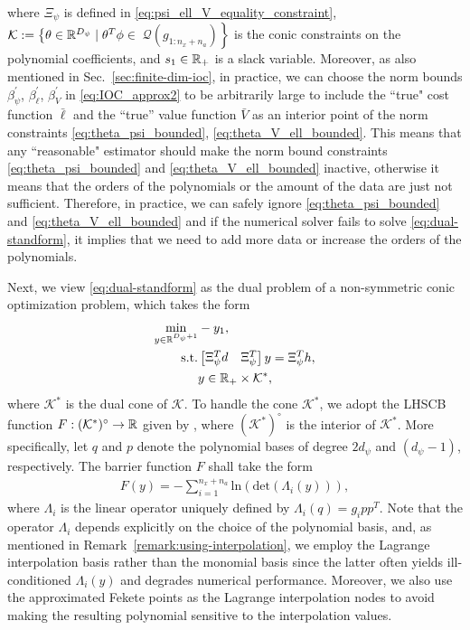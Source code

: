 where $\Xi_\psi$ is defined in \eqref{eq:psi_ell_V_equality_constraint}, $\mathcal{K} := \left\{\theta\in\mathbb{R}^{D_\psi} \mid \theta^T\phi\in \right.$ $\left.\mathscr{Q}(g_{1:n_x+n_a})\right\}$ is the conic constraints on the polynomial coefficients, and $s_1\in\mathbb{R}_+$ is a slack variable. 
Moreover, as also mentioned in Sec.~\ref{sec:finite-dim-ioc}, in practice, we can choose the norm bounds $\beta_\psi^\prime$, $\beta_\ell^\prime$, $\beta_V^\prime$ in \eqref{eq:IOC_approx2} to be arbitrarily large to include the ``true" cost function $\bar{\ell}$ and the ``true'' value function $\bar{V}$ as an interior point of the norm constraints \eqref{eq:theta_psi_bounded}, \eqref{eq:theta_V_ell_bounded}.
This means that any ``reasonable" estimator should make the norm bound constraints \eqref{eq:theta_psi_bounded} and \eqref{eq:theta_V_ell_bounded} inactive, otherwise it means that the orders of the polynomials or the amount of the data are just not sufficient.
Therefore, in practice, we can safely ignore \eqref{eq:theta_psi_bounded} and \eqref{eq:theta_V_ell_bounded} and if the numerical solver fails to solve \eqref{eq:dual-standform}, it implies that we need to add more data or increase the orders of the polynomials.

Next, we view \eqref{eq:dual-standform} as the dual problem of a non-symmetric conic optimization problem, which takes the form
\begin{equation}
\begin{aligned}
    \min_{y\in \mathbb{R}^{D_\psi+1}} &-y_1,\\
    \mathrm{s.t. }&\begin{bmatrix}\Xi_\psi^Td &\Xi_\psi^T  \end{bmatrix}y =\Xi_\psi^Th,\\
    & y\in \mathbb{R}_+\times\mathcal{K}^*,
\end{aligned}
\label{eq:final_primal_problem}
\end{equation}
where $\mathcal{K}^*$ is the dual cone of $\mathcal{K}$.
To handle the cone $\mathcal{K}^*$, we adopt the LHSCB function $F:(\mathcal{K}^*)^\circ\rightarrow\mathbb{R}$ given by \citep[Sec.~6]{Papp2019sum}, where $(\mathcal{K}^*)^\circ$ is the interior of $\mathcal{K}^*$. 
More specifically, let $q$ and $p$ denote the polynomial bases of degree $2d_\psi$ and $(d_\psi-1)$, respectively. The barrier function $F$ shall take the form
\begin{align*}
    F(y) = -\sum_{i=1}^{n_x+n_a}\mathrm{ln}\left(\mathrm{det}\left(\Lambda_i(y)\right)\right),
\end{align*}
where $\Lambda_i$ is the linear operator uniquely defined by $\Lambda_i(q)=g_i pp^T$.
Note that the operator $\Lambda_i$ depends explicitly on the choice of the polynomial basis, and, as mentioned in Remark~\ref{remark:using-interpolation}, we employ the Lagrange interpolation basis rather than the monomial basis since the latter often yields ill-conditioned $\Lambda_i(y)$ and degrades numerical performance. 
Moreover, we also use the approximated Fekete points \citep{Sommariva2009FeketePoints} as the Lagrange interpolation nodes to avoid making the resulting polynomial sensitive to the interpolation values.

